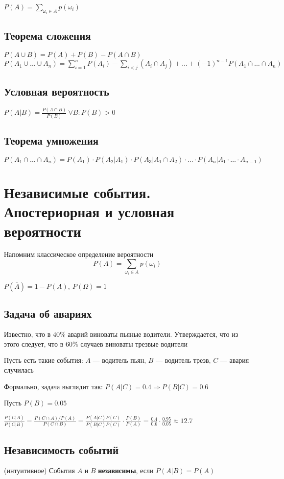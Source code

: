 \documentclass[a4paper, 10pt]{article}
\begin{document}
 $P(A)=\sum_{\omega_i\in A}p(\omega_i)$
\subsection{Теорема сложения}
\indent $P(A\cup B)=P(A)+P(B)-P(A\cap B)$\\[2mm]
\indent $P(A_1\cup\ldots\cup A_n)=\sum_{i=1}^{n} P(A_i)-\sum_{i<j} (A_i\cap A_j)+\ldots+(-1)^{n-1}P(A_1\cap\ldots\cap A_n)$
\subsection{Условная вероятность}
$P(A|B)=\displaystyle\frac{P(A\cap B)}{P(B)}\ \forall B: P(B)>0$
\subsection{Теорема умножения}
$P(A_1\cap\ldots\cap A_n)=P(A_1)\cdot P(A_2|A_1)\cdot P(A_3|A_1\cap A_2)\cdot\ldots\cdot P(A_n|A_1\cdot\ldots\cdot A_{n-1})$





\newpage
\section{Независимые события. Апостериорная и условная вероятности}
Напомним классическое определение вероятности
$$P(A)=\sum_{\omega_i\in A}p(\omega_i)$$

\comment $P(\overline{A})=1-P(A),\ P(\Omega)=1$

\subsection{Задача об авариях}
Известно, что в $40\%$ аварий виноваты пьяные водители. Утверждается, что из этого следует, что в $60\%$ случаев виноваты трезвые водители

Пусть есть такие события: $A$ — водитель пьян, $B$ — водитель трезв, $C$ — авария случилась

Формально, задача выглядит так: $P(A|C)=0.4\Longrightarrow P(B|C)=0.6$

Пусть $P(B)=0.05$

$\displaystyle\frac{P(C|A)}{P(C|B)}=\frac{P(C\cap A)/P(A)}{P(C\cap B)}=\frac{P(A|C)P(C)}{P(B|C)P(C)}\cdot\frac{P(B)}{P(A)}=\frac{0.4}{0.6}\cdot\frac{0.95}{0.05}\approx 12.7$

\subsection{Независимость событий}
 (интуитивное) События  $A\text{ и }B$ \textbf{независимы}, если $P(A|B)=P(A)$
\end{document}

